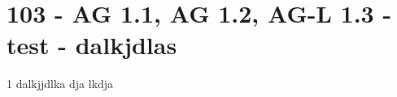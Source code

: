 \section{103 - AG 1.1, AG 1.2, AG-L 1.3 - test - dalkjdlas}

\begin{langesbeispiel} \item[1] %
dalkjjdlka dja lkdja	

\end{langesbeispiel}